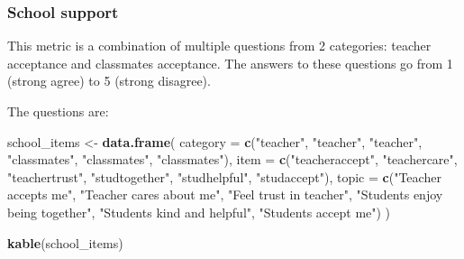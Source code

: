 \documentclass[
]{article}
\newenvironment{Shaded}{\begin{snugshade}}{\end{snugshade}}
\newcommand{\AttributeTok}[1]{\textcolor[rgb]{0.13,0.29,0.53}{#1}}
\newcommand{\CommentTok}[1]{\textcolor[rgb]{0.56,0.35,0.01}{\textit{#1}}}
\newcommand{\FunctionTok}[1]{\textcolor[rgb]{0.13,0.29,0.53}{\textbf{#1}}}
\newcommand{\NormalTok}[1]{#1}
\newcommand{\OtherTok}[1]{\textcolor[rgb]{0.56,0.35,0.01}{#1}}
\newcommand{\StringTok}[1]{\textcolor[rgb]{0.31,0.60,0.02}{#1}}
\begin{document}
\begin{Shaded}
\end{Shaded}

\subsubsection{School support}\label{school-support}

This metric is a combination of multiple questions from 2 categories:
teacher acceptance and classmates acceptance. The answers to these
questions go from 1 (strong agree) to 5 (strong disagree).

The questions are:

\begin{Shaded}
\begin{Highlighting}[]
\NormalTok{school\_items }\OtherTok{\textless{}{-}} \FunctionTok{data.frame}\NormalTok{(}
  \AttributeTok{category =} \FunctionTok{c}\NormalTok{(}\StringTok{"teacher"}\NormalTok{, }\StringTok{"teacher"}\NormalTok{, }\StringTok{"teacher"}\NormalTok{,}
               \StringTok{"classmates"}\NormalTok{, }\StringTok{"classmates"}\NormalTok{, }\StringTok{"classmates"}\NormalTok{),}
  \AttributeTok{item =} \FunctionTok{c}\NormalTok{(}\StringTok{"teacheraccept"}\NormalTok{,}
           \StringTok{"teachercare"}\NormalTok{,}
           \StringTok{"teachertrust"}\NormalTok{,}
           \StringTok{"studtogether"}\NormalTok{,}
           \StringTok{"studhelpful"}\NormalTok{,}
           \StringTok{"studaccept"}\NormalTok{),}
  \AttributeTok{topic =} \FunctionTok{c}\NormalTok{(}\StringTok{"Teacher accepts me"}\NormalTok{,}
            \StringTok{"Teacher cares about me"}\NormalTok{,}
            \StringTok{"Feel trust in teacher"}\NormalTok{,}
            \StringTok{"Students enjoy being together"}\NormalTok{,}
            \StringTok{"Students kind and helpful"}\NormalTok{,}
            \StringTok{"Students accept me"}\NormalTok{)}
\NormalTok{)}

\FunctionTok{kable}\NormalTok{(school\_items)}
\end{Highlighting}
\end{Shaded}
\end{document}
